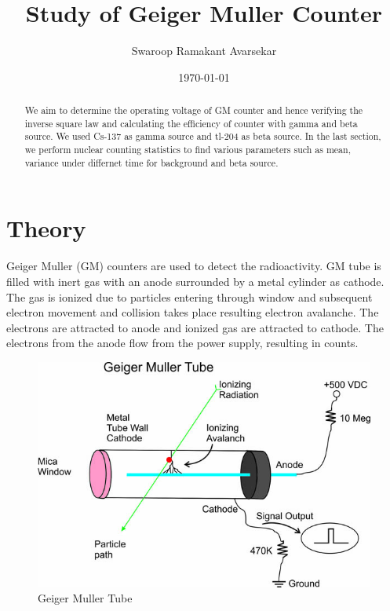 \documentclass[a4paper, amsfonts, amssymb, amsmath, reprint, showkeys, nofootinbib, twoside]{revtex4-1}
\begin{document}
\title{Study of Geiger Muller Counter}
\author{Swaroop Ramakant Avarsekar}
\date{\today}

\begin{abstract}
We aim to determine the operating voltage of GM counter and hence verifying the inverse square law and calculating the efficiency of counter with gamma and beta source. We used Cs-137 as gamma source and tl-204 as beta source. In the last section, we perform nuclear counting statistics to find various parameters such as mean, variance under differnet time for background and beta source.
\end{abstract}
	

\maketitle

\section{Theory}
Geiger Muller (GM) counters are used to detect the radioactivity. GM tube is filled with inert gas with an anode surrounded by a metal cylinder as cathode. The gas is ionized due to particles entering through window and subsequent electron movement and collision takes place resulting electron avalanche. The electrons are attracted to anode and ionized gas are attracted to cathode. The electrons from the anode flow from the power supply, resulting in counts. 

\begin{figure}[H]
	\centering
	\includegraphics[scale=0.3]{gm} 
	\caption{Geiger Muller Tube}
	\label{1}
\end{figure}
\end{document}
